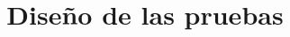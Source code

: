 \documentclass[12pt,letterpaper]{report}
\begin{document}
\renewcommand{\listtablename}{Índice de tablas}
\renewcommand{\tablename}{Tabla}
    \title{\textbf{Diseño de las pruebas}}
    \author{\textbf{}}


\beforepreface



\newpage
\afterpreface



 




%
%
%
\end{document}
